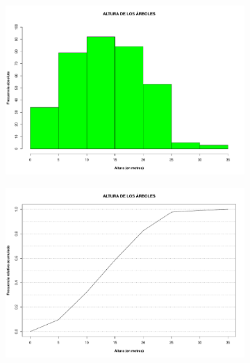 \documentclass[11pt]{article}
\begin{document}
\begin{figure}[h!]
  \begin{center}
    \begin{subfigure}[b]{0.9\linewidth}
      \includegraphics[width=\linewidth]{histAltura.pdf}
      \caption{}
      \label{fig:histAltura}
    \end{subfigure}
  \end{center}
\end{figure}

\newpage

\begin{figure}[h!]
  \ContinuedFloat
  \begin{center}
    \begin{subfigure}[b]{0.9\linewidth}
      \includegraphics[width=\linewidth]{acumAltura.pdf}
      \caption{}
      \label{fig:acumAltura}
    \end{subfigure}
  \caption{}
  \end{center}  
\end{figure}
\end{document}

